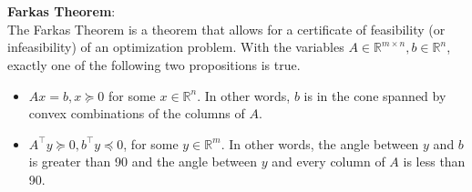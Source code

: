 \\ \\ 
\textbf{Farkas Theorem}: 
\\
The Farkas Theorem is a theorem that allows for a certificate of feasibility (or infeasibility) of an optimization problem. With the variables $A \in \mathbb{R}^{m \times n}, b \in \mathbb{R}^n$, exactly one of the following two propositions is true.
\begin{itemize}
  \item $Ax = b, x \succeq 0$ for some $x \in \mathbb{R}^n$. In other words, $b$ is in the cone spanned by convex combinations of the columns of $A$.
  \item $A^\top y \succeq 0, b^\top y \preceq 0$, for some $y \in \mathbb{R}^m$. In other words, the angle between $y$ and $b$ is greater than 90 and the angle between $y$ and every column of $A$ is less than 90. 
\end{itemize}
